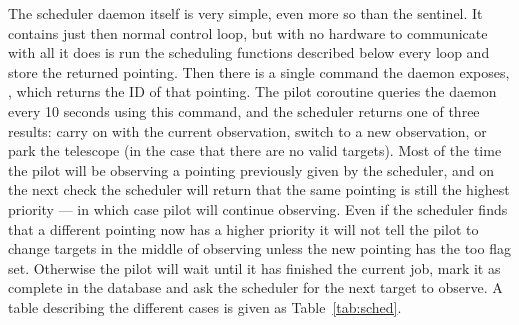 \begin{colsection}
\begin{colsection}
The scheduler daemon itself is very simple, even more so than the sentinel. It contains just then normal control loop, but with no hardware to communicate with all it does is run the scheduling functions described below every loop and store the returned pointing. Then there is a single command the daemon exposes, , which returns the ID of that pointing. The pilot  coroutine queries the daemon every 10 seconds using this command, and the scheduler returns one of three results: carry on with the current observation, switch to a new observation, or park the telescope (in the case that there are no valid targets). Most of the time the pilot will be observing a pointing previously given by the scheduler, and on the next check the scheduler will return that the same pointing is still the highest priority --- in which case pilot will continue observing. Even if the scheduler finds that a different pointing now has a higher priority it will not tell the pilot to change targets in the middle of observing unless the new pointing has the \gls{too} flag set. Otherwise the pilot will wait until it has finished the current job, mark it as complete in the database and ask the scheduler for the next target to observe. A table describing the different cases is given as Table~\ref{tab:sched}.



\end{colsection}
\end{colsection}
